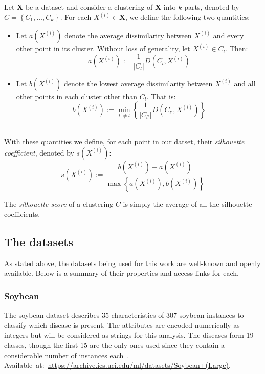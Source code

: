 \begin{definition}\label{def:silhouette}
    Let \textbf{X} be a dataset and consider a clustering of \textbf{X} into
    \(k\) parts, denoted by \(C = \left\{C_1, \ldots, C_k\right\}\). For each
    \(X^{(i)} \in \textbf{X}\), we define the following two quantities:
    \begin{itemize}
        \item Let \(a\left(X^{(i)}\right)\) denote the average dissimilarity
            between \(X^{(i)}\) and every other point in its cluster. Without
            loss of generality, let \(X^{(i)} \in C_l\). Then:
            \[
                a\left(X^{(i)}\right) := \frac{1}{|C_l|} D\left(C_l,
                X^{(i)}\right)
            \]
        \item Let \(b\left(X^{(i)}\right)\) denote the lowest average 
            dissimilarity between \(X^{(i)}\) and all other points in each
            cluster other than \(C_l\). That is:
            \[
                b\left(X^{(i)}\right) := \min_{l' \neq l} \left\{
                \frac{1}{|C_{l'}|} D\left(C_{l'}, X^{(i)}\right) \right\}
            \]\\
    \end{itemize}

    With these quantities we define, for each point in our datset, their
    \emph{silhouette coefficient}, denoted by \(s(X^{(i)})\):
    \[
        s(X^{(i)}) := \frac{b\left(X^{(i)}\right) -
        a\left(X^{(i)}\right)}{\max\left\{a\left(X^{(i)}\right),
        b\left(X^{(i)}\right)\right\}}
    \]

    The \emph{silhouette score} of a clustering \(C\) is simply the average of
all the silhouette coefficients.
\end{definition}


\subsection{The datasets}\label{subsec:datasets}

As stated above, the datasets being used for this work are well-known and openly
available. Below is a summary of their properties and access links for each.

\subsubsection*{Soybean}

The soybean dataset describes 35 characteristics of 307 soybean instances to
classify which disease is present. The attributes are encoded numerically as
integers but will be considered as strings for this analysis.
The diseases form 19 classes, though the first 15 are the only ones used since
they contain a considerable number of instances each~\cite{Soybean}. 
Available~at:~\url{https://archive.ics.uci.edu/ml/datasets/Soybean+(Large)}.

